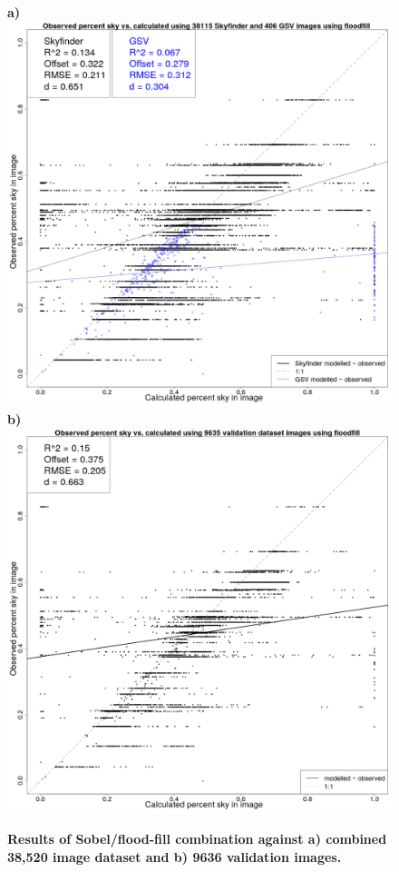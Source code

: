 \documentclass[final,3p,times,authoryear]{elsarticle}
\begin{document}
\begin{figure}
\centering
\textbf{a)}\includegraphics[scale=0.15]{Images/ErrorPlots2FloodfillAll.png}
\textbf{b)}\includegraphics[scale=0.15]{Images/ErrorPlots2FloodfillValidation.png}
\caption{\textbf{Results of Sobel/flood-fill combination against a) combined 38,520 image dataset and b) 9636 validation images.}}
\label{fig:errorfloodall}
\end{figure}
\end{document}
